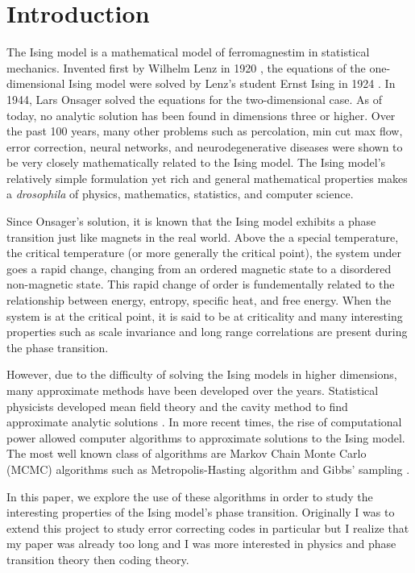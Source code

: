 \documentclass{article}
\begin{document}
\section{Introduction}
\label{Introduction}
    The Ising model is a mathematical model of ferromagnestim in statistical mechanics.
    Invented first by Wilhelm Lenz in 1920 \cite{Lenz1920}, the equations of the one-dimensional Ising model were solved by
    Lenz's student Ernst Ising in 1924 \cite{Ising1925}. In 1944, Lars Onsager \cite{Onsager1944} solved the equations for the two-dimensional case. 
    As of today, no analytic solution has been found in dimensions three or higher. Over the past 100 years, many other problems such as percolation, min cut max flow, error correction, neural networks, and neurodegenerative diseases were
    shown to be very closely mathematically related to the Ising model. 
    The Ising model's relatively simple formulation yet rich and general mathematical properties makes a \textit{drosophila} of physics, mathematics, statistics, and computer science.

    Since Onsager's solution, it is known that the Ising model exhibits a phase transition just like magnets in the real world. Above the
    a special temperature, the critical temperature (or more generally the critical point), the system under goes a rapid change, changing from an ordered magnetic state to a disordered non-magnetic state. 
    This rapid change of order is fundementally related to the relationship between energy, entropy, specific heat, and free energy. When the system is at the critical point, it is said to be at
    criticality and many interesting properties such as scale invariance \cite{Parisi2002} and long range correlations \cite{Griffiths1967} \cite{Wu1976} are present
    during the phase transition. 

    However, due to the difficulty of solving the Ising models in higher dimensions, many approximate methods have been developed over the years. 
    Statistical physicists developed mean field theory and the cavity method to find approximate analytic solutions \cite{Merhav2010} \cite{Mezard2009}. In more recent times, the rise of computational 
    power allowed computer algorithms to approximate solutions to the Ising model. The most well known class of algorithms are Markov Chain Monte Carlo (MCMC) algorithms such as 
    Metropolis-Hasting algorithm and Gibbs' sampling \cite{Tierney1994}. 
    
    In this paper, we explore the use of these algorithms in order to study the interesting properties of the Ising model's phase transition. Originally I was to extend
    this project to study error correcting codes in particular but I realize that my paper was already too long and I was more interested in physics and phase transition theory
    then coding theory.
\end{document}

